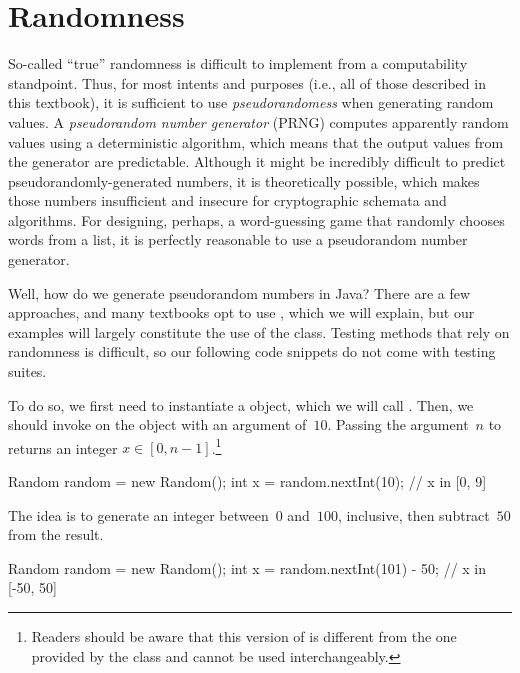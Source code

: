 \section{Randomness}
So-called ``true'' randomness is difficult to implement from a computability standpoint. 
Thus, for most intents and purposes (i.e., all of those described in this textbook), it is sufficient to use \emph{pseudorandomess} when generating random values. 
A \emph{pseudorandom number generator} (PRNG) computes apparently random values using a deterministic algorithm, which means that the output values from the generator are predictable. 
Although it might be incredibly difficult to predict pseudorandomly-generated numbers, it is theoretically possible, which makes those numbers insufficient and insecure for cryptographic schemata and algorithms. 
For designing, perhaps, a word-guessing game that randomly chooses words from a list, it is perfectly reasonable to use a pseudorandom number generator.

Well, how do we generate pseudorandom numbers in Java? 
There are a few approaches, and many textbooks opt to use , which we will explain, but our examples will largely constitute the use of the  class. 
Testing methods that rely on randomness is difficult, so our following code snippets do not come with testing suites. 

\newpage %
To do so, we first need to instantiate a  object, which we will call . 
Then, we should invoke  on the  object with an argument of~$10$. Passing the argument~$n$ to  returns an integer $x \in [0, n-1]$.\footnote{Readers should be aware that this version of  is different from the one provided by the  class and cannot be used interchangeably.}

\begin{verbnobox}[\small]
Random random = new Random();
int x = random.nextInt(10); // x in [0, 9]
\end{verbnobox}

The idea is to generate an integer between~$0$ and~$100$, inclusive, then subtract~$50$ from the result.

\begin{verbnobox}[\small]
Random random = new Random();
int x = random.nextInt(101) - 50; // x in [-50, 50]
\end{verbnobox}

